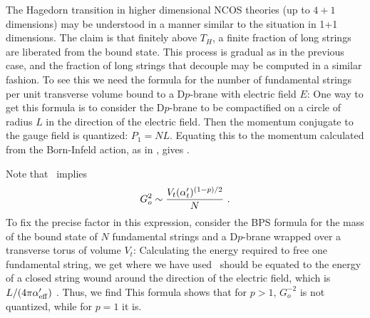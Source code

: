The Hagedorn transition in higher dimensional NCOS theories
(up to $4+1$ dimensions) may be
understood in a manner similar to the situation in 1+1 dimensions.
The claim is that finitely above $T_H$, a finite fraction of
long strings are liberated from the bound state. This process is
gradual as in the previous case, and the fraction of long strings that
decouple may be computed in a similar fashion.
To see this we need the formula for the number of fundamental strings
per unit transverse volume bound
to a D$p$-brane with electric field $E$:
%
%
One way to get this formula is to consider the D$p$-brane to be compactified on
a circle of radius $L$
in the direction of the electric field. Then the momentum conjugate
to the gauge field is quantized: $P_1=NL$. Equating this to the momentum
calculated from the Born-Infeld action, as in \cite{GKP}, gives \nerel.

Note that \nerel\ implies
$$ G_o^2 \sim {V_t (\alpha'_t)^{(1-p)/2}\over N}
\ .
$$
To fix the precise factor in this expression, consider the BPS
formula for the mass of the bound state of
$N$ fundamental strings and a D$p$-brane
wrapped over a transverse torus of volume $V_t$:
Calculating the energy required to free one fundamental string,  we get
where we have used
\wounden\ should be equated to the energy of a closed string wound around the
direction of the electric field,
which is $L/(4\pi \alpha'_{\rm eff})$ \cite{KM}.
Thus, we find
This formula shows that for $p>1$, $G_o^{-2}$ is not quantized, while
for $p=1$ it is.


